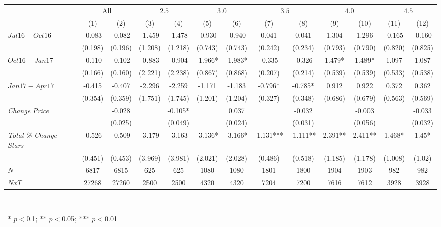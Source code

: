 \begin{center}
\begin{tabular}{lcccccccccccc}
\hline  & \multicolumn{2}{c}{All} & \multicolumn{2}{c}{ $ 2.5 $ } & \multicolumn{2}{c}{ $ 3.0 $ } & \multicolumn{2}{c}{ $ 3.5 $ } & \multicolumn{2}{c}{ $ 4.0 $ } & \multicolumn{2}{c}{ $ 4.5$ }\\
 & (1) & (2) & (3) & (4) & (5) & (6) & (7) & (8) & (9) & (10) & (11) & (12)\\
\hline  $ Jul16-Oct16 $  & -0.083 & -0.082 & -1.459 & -1.478 & -0.930 & -0.940 & 0.041 & 0.041 & 1.304 & 1.296 & -0.165 & -0.160\\
 & (0.198) & (0.196) & (1.208) & (1.218) & (0.743) & (0.743) & (0.242) & (0.234) & (0.793) & (0.790) & (0.820) & (0.825)\\
 $ Oct16-Jan17 $  & -0.110 & -0.102 & -0.883 & -0.904 & -1.966* & -1.983* & -0.335 & -0.326 & 1.479* & 1.489* & 1.097 & 1.087\\
 & (0.166) & (0.160) & (2.221) & (2.238) & (0.867) & (0.868) & (0.207) & (0.214) & (0.539) & (0.539) & (0.533) & (0.538)\\
 $ Jan17-Apr17 $  & -0.415 & -0.407 & -2.296 & -2.259 & -1.171 & -1.183 & -0.796* & -0.785* & 0.912 & 0.922 & 0.372 & 0.362\\
 & (0.354) & (0.359) & (1.751) & (1.745) & (1.201) & (1.204) & (0.327) & (0.348) & (0.686) & (0.679) & (0.563) & (0.569)\\
 \textit{Change Price}  &  & -0.028 &  & -0.105* &  & 0.037 &  & -0.032 &  & -0.003 &  & -0.033\\
 &  & (0.025) &  & (0.049) &  & (0.024) &  & (0.031) &  & (0.056) &  & (0.032)\\
\hline \textit{Total \% Change Stars} & -0.526 & -0.509 & -3.179 & -3.163 & -3.136* & -3.166* & -1.131*** & -1.111** & 2.391** & 2.411** & 1.468* & 1.45*\\
  & (0.451) & (0.453) & (3.969) & (3.981) & (2.021) & (2.028) & (0.486) & (0.518) & (1.185) & (1.178) & (1.008) & (1.02)\\
\hline  $ N $  & 6817 & 6815 & 625 & 625 & 1080 & 1080 & 1801 & 1800 & 1904 & 1903 & 982 & 982\\
 $ NxT $  & 27268 & 27260 & 2500 & 2500 & 4320 & 4320 & 7204 & 7200 & 7616 & 7612 & 3928 & 3928\\
\hline\end{tabular}\\
\begin{tiny}\ * $p<0$.1; ** $p<0$.05; *** $p<0$.01\end{tiny}\\
\end{center}

